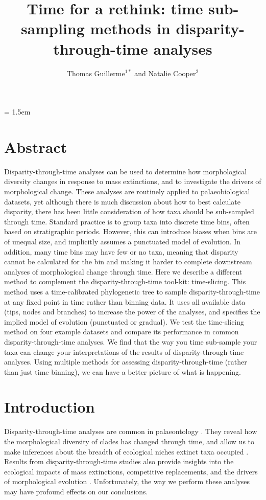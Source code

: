 \documentclass[12pt,a4paper]{article}
\title{Time for a rethink: time sub-sampling methods in disparity-through-time analyses}
\author{
	Thomas Guillerme$^{1*}$ and Natalie Cooper$^{2}$
}
\date{}
\affiliation{\noindent{\footnotesize
	$^1$School of Biological Sciences, University of Queensland, St. Lucia, Queensland, Australia.\\
	$^2$Department of Life Sciences, Natural History Museum, Cromwell Road, London, SW7 5BD, UK. natalie.cooper@nhm.ac.uk}\\
	$^*$Corresponding author\\}
\begin{document}
\mstitlepage
\parindent = 1.5em
\addtolength{\parskip}{.3em}

\section{Abstract}

Disparity-through-time analyses can be used to determine how morphological diversity changes in response to mass extinctions, and to investigate the drivers of morphological change.
These analyses are routinely applied to palaeobiological datasets, yet although there is much discussion about how to best calculate disparity, there has been little consideration of how taxa should be sub-sampled through time.
Standard practice is to group taxa into discrete time bins, often based on stratigraphic periods. 
However, this can introduce biases when bins are of unequal size, and implicitly assumes a punctuated model of evolution. 
In addition, many time bins may have few or no taxa, meaning that disparity cannot be calculated for the bin and making it harder to complete downstream analyses of morphological change through time.
Here we describe a different method to complement the disparity-through-time tool-kit: time-slicing.
This method uses a time-calibrated phylogenetic tree to sample disparity-through-time at any fixed point in time rather than binning data.
It uses all available data (tips, nodes and branches) to increase the power of the analyses, and specifies the implied model of evolution (punctuated or gradual).
We test the time-slicing method on four example datasets and compare its performance in common disparity-through-time analyses.
We find that the way you time sub-sample your taxa can change your interpretations of the results of disparity-through-time analyses.
Using multiple methods for assessing disparity-through-time (rather than just time binning), we can have a better picture of what is happening.

\newpage
\raggedright
\doublespacing
\setlength{\parindent}{1cm}

\section{Introduction}
Disparity-through-time analyses are common in palaeontology \citep{gould1991disparity,briggs1992morphological,Wills1994,Foote01071994}.
They reveal how the morphological diversity of clades has changed through time, and allow us to make inferences about the breadth of ecological niches extinct taxa occupied \citep{foote1997evolution}.
Results from disparity-through-time studies also provide insights into the ecological impacts of mass extinctions, competitive replacements, and the drivers of morphological evolution \citep{Brusatte12092008,Foote29111996,friedmanexplosive2010}.
Unfortunately, the way we perform these analyses may have profound effects on our conclusions.
\end{document}
